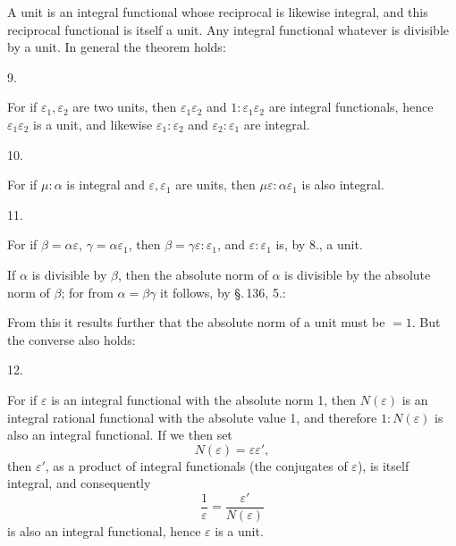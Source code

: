 
A unit is an integral functional whose reciprocal is likewise integral, and this reciprocal functional is itself a unit. Any integral functional whatever is divisible by a unit. In general the theorem holds:

9. 

For if $\varepsilon_1, \varepsilon_2$ are two units, then $\varepsilon_1\varepsilon_2$ and $1:\varepsilon_1\varepsilon_2$ are integral functionals, hence $\varepsilon_1\varepsilon_2$ is a unit, and likewise $\varepsilon_1:\varepsilon_2$ and $\varepsilon_2:\varepsilon_1$ are integral.

10. 

For if $\mu:\alpha$ is integral and $\varepsilon, \varepsilon_1$ are units, then $\mu\varepsilon:\alpha\varepsilon_1$ is also integral.

11. 

For if $\beta=\alpha\varepsilon$, $\gamma=\alpha\varepsilon_1$, then $\beta=\gamma\varepsilon:\varepsilon_1$, and $\varepsilon:\varepsilon_1$ is, by 8., a unit.

If $\alpha$ is divisible by $\beta$, then the absolute norm of $\alpha$ is divisible by the absolute norm of $\beta$; for from $\alpha=\beta\gamma$ it follows, by \S.\,136, 5.:


From this it results further that the absolute norm of a unit must be $=1$. But the converse also holds:

12. 

For if $\varepsilon$ is an integral functional with the absolute norm 1, then $N(\varepsilon)$ is an integral rational functional with the absolute value 1, and therefore $1:N(\varepsilon)$ is also an integral functional. If we then set
\[
N(\varepsilon) = \varepsilon\varepsilon',
\]
then $\varepsilon'$, as a product of integral functionals (the conjugates of $\varepsilon$), is itself integral, and consequently
\[
\frac{1}{\varepsilon} = \frac{\varepsilon'}{N(\varepsilon)}
\]
is also an integral functional, hence $\varepsilon$ is a unit.
